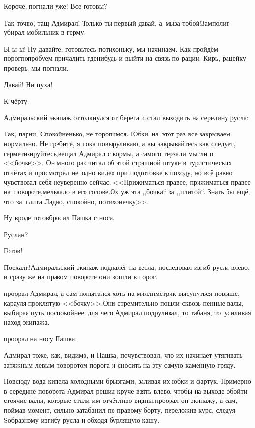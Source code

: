 \diagdash Короче, погнали уже! Все готовы?

\diagdash Так точно, тащ Адмирал! Только ты первый давай, а~мы\mdash за тобой!\mdash Замполит убирал мобильник в герму.

\diagdash Ы-ы-ы! Ну давайте, готовьтесь потихоньку, мы начинаем. Как пройдём порог\mdash попробуем причалить где\sdash нибудь и выйти на связь по рации. Кирь, рацейку проверь, мы погнали.

\diagdash Давай! Ни пуха!

\diagdash К чёрту!

Адмиральский экипаж оттолкнулся от берега и стал выходить на середину русла:

\diagdash Так, парни. Спокойненько, не торопимся. Юбки~на~этот раз все закрываем нормально. Не гребите, я пока повыруливаю, а вы закрывайтесь как следует, герметизируйтесь,\mdash вещал Адмирал с кормы, а самого терзали мысли о <<бочке>>. Он много раз читал об этой страшной штуке в туристических отчётах и просмотрел не~одно видео при подготовке к походу, но всё равно чувствовал себя неуверенно сейчас. <<Прижиматься правее, прижиматься правее на~повороте,\mdash мелькало в его голове.\mdash Ох уж эта ,,бочка`` за ,,плитой``. Знать бы ещё, что за~плита\myldots{} Ладно, спокойно, потихонечку>>.

\diagdash Ну вроде готов\myldots{}\mdash бросил Пашка с носа.

\diagdash Руслан?

\diagdash Готов!

\diagdash Поехали!\mdash Адмиральский экипаж подналёг на весла, последовал изгиб русла влево, и сразу же на правом повороте они вошли в порог.

\mdash проорал Адмирал, а сам попытался хоть на миллиметрик высунуться повыше, карауля проклятую <<бочку>>.\mdash Они стремительно пошли сквозь пенные валы, выбирая путь поспокойнее, для чего Адмирал подруливал, то табаня, то~усиливая наход экипажа. 

\mdash проорал на носу Пашка.

\mdash Адмирал тоже, как, видимо, и Пашка, почувствовал, что их начинает утягивать затяжным левым поворотом порога и сносить на эту самую каменную гряду. 

Повсюду вода кипела холодными брызгами, заливая их юбки и фартук. Примерно в середине поворота Адмирал решил круче взять влево, чтобы на выходе обойти стоячие валы, которые стали им отчётливо видны.\mdash проорал он экипажу, а сам, поймав момент, сильно затабанил по правому борту, переложив курс, следуя S\sdash образному изгибу русла и обходя бурлящую кашу. 

